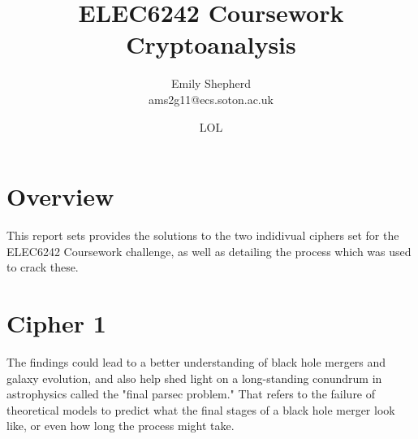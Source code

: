 \documentclass{article}
\title{ELEC6242 Coursework Cryptoanalysis}
\author{Emily Shepherd \\ ams2g11@ecs.soton.ac.uk}
\date{LOL}
\begin{document}
    \maketitle

    \section{Overview}

    This report sets provides the solutions to the two indidivual
    ciphers set for the ELEC6242 Coursework challenge, as well as
    detailing the process which was used to crack these.

    \section{Cipher 1}

    \begin{displayquote}
        The findings could lead to a better understanding of black hole
        mergers and galaxy evolution, and also help shed light on a
        long-standing conundrum in astrophysics called the "final
        parsec problem." That refers to the failure of theoretical
        models to predict what the final stages of a black hole merger
        look like, or even how long the process might take.
    \end{displayquote}
\end{document}
